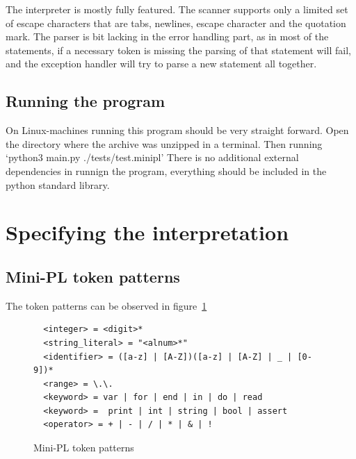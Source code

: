 \documentclass[12pt,a4paper]{article}
\begin{document}
The interpreter is mostly fully featured. 
The scanner supports only a limited set of escape characters that are
tabs, newlines, escape character and the quotation mark.
The parser is bit lacking
in the error handling part, as in most of the statements, if a 
necessary token is missing the parsing of that statement will fail,
and the exception handler will try to parse a new statement all together.


\subsection{Running the program}

On Linux-machines running this program should be very straight forward.
Open the directory where the archive was unzipped in a terminal.
Then running 
`python3 main.py ./tests/test.minipl'
There is no additional external dependencies in runnign the program,
everything should be included in the python standard library.


\section{Specifying the interpretation}

\subsection{Mini-PL token patterns}
The token patterns can be observed in figure~\ref{token_patterns}
\begin{figure}\label{token_patterns}
  \caption{Mini-PL token patterns}
  \begin{verbatim}
  <integer> = <digit>*
  <string_literal> = "<alnum>*"
  <identifier> = ([a-z] | [A-Z])([a-z] | [A-Z] | _ | [0-9])*
  <range> = \.\.
  <keyword> = var | for | end | in | do | read 
  <keyword> =  print | int | string | bool | assert
  <operator> = + | - | / | * | & | !
  \end{verbatim}
\end{figure}
\end{document}
